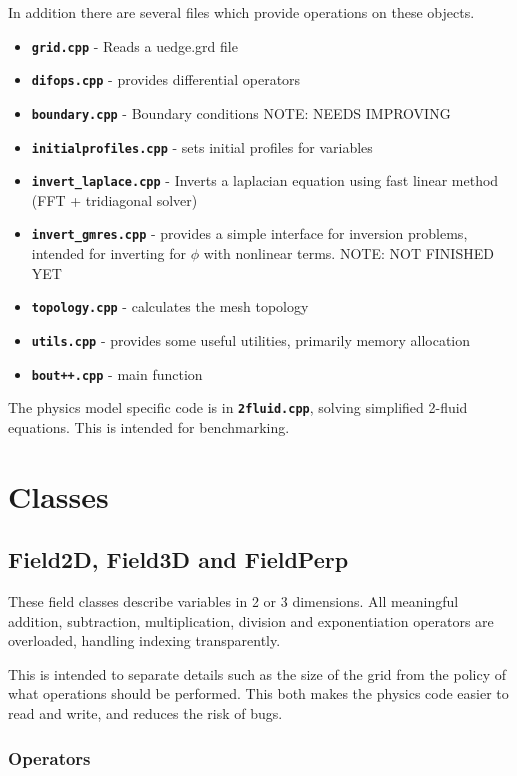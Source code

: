 \documentclass[12pt, a4paper]{article}
\newcommand{\file}[1]{\texttt{\bf #1}}
\begin{document}
In addition there are several files which provide operations on these objects.
\begin{itemize}
\item \file{grid.cpp} - Reads a uedge.grd file
\item \file{difops.cpp} - provides differential operators
\item \file{boundary.cpp} - Boundary conditions NOTE: NEEDS IMPROVING
\item \file{initialprofiles.cpp} - sets initial profiles for variables
\item \file{invert\_laplace.cpp} - Inverts a laplacian equation using fast linear method
  (FFT + tridiagonal solver)
\item \file{invert\_gmres.cpp} - provides a simple interface for inversion problems,
  intended for inverting for $\phi$ with nonlinear terms. NOTE: NOT FINISHED YET
\item \file{topology.cpp} - calculates the mesh topology
\item \file{utils.cpp} - provides some useful utilities, primarily memory allocation
\item \file{bout++.cpp} - main function
\end{itemize}

The physics model specific code is in \file{2fluid.cpp}, solving
simplified 2-fluid equations. This is intended for benchmarking.

\section{Classes}



\subsection{Field2D, Field3D and FieldPerp}

These field classes describe variables in 2 or 3 dimensions. All meaningful
addition, subtraction, multiplication, division and exponentiation operators
are overloaded, handling indexing transparently. 

This is intended to separate details such as the size of the grid from the policy
of what operations should be performed. This both makes the physics code
easier to read and write, and reduces the risk of bugs.

\subsubsection{Operators}
\end{document}
